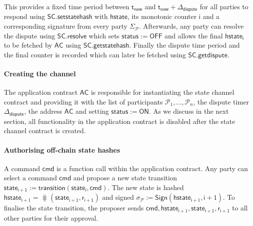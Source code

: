 \documentclass{llncs}
\newcommand{\chanstatus}{\mathsf{status}}
\newcommand{\chanon}{\mathsf{ON}}
\newcommand{\chanoff}{\mathsf{OFF}}
\newcommand{\cmd}{\mathsf{cmd}}
\newcommand{\hstate}{\mathsf{hstate}}
\newcommand{\hstatei}{\mathsf{hstate}_{\monotoniccounter}}
\newcommand{\hstateplus}{\ensuremath{\mathsf{hstate}_{\monotoniccounter+1}}}
\newcommand{\monotoniccounter}{\mathsf{i}}
\newcommand{\stateinfoi}{\mathsf{state}_{\mathsf{i}}}
\newcommand{\stateinfoplus}{\mathsf{state}_{\mathsf{i+1}}}
\newcommand{\participant}{\mathcal{P}}
\newcommand{\ranplus}{\mathsf{r}_{\mathsf{i+1}}}
\newcommand{\statechannelsetstate}{\mathsf{SC}.\mathsf{setstatehash}}
\newcommand{\statechannelresolve}{\mathsf{SC}.\mathsf{resolve}}
\newcommand{\statechannelgetcommitment}{\mathsf{SC}.\mathsf{getstatehash}}
\newcommand{\statechannelgetdispute}{\mathsf{SC}.\mathsf{getdispute}}
\newcommand{\sign}{\mathsf{Sign}}
\newcommand{\appcontract}{\mathsf{AC}}
\newcommand{\timerdispute}{\mathsf{\Delta}_{\mathsf{dispute}}}
\newcommand{\timenow}{\mathsf{t}_{\mathsf{now}}}
\newcommand{\timedispute}{\timenow + \mathsf{\Delta}_{\mathsf{dispute}}}
\begin{document}
This provides a fixed time period between $\timenow$ and $\timedispute$ for all parties to respond using $\statechannelsetstate$ with $\hstate$, its monotonic counter $\monotoniccounter$ and a corresponding signature from every party $\Sigma_{\participant}$. 
Afterwards, any party can resolve the dispute using $\statechannelresolve$ which sets $\chanstatus := \chanoff$ and allows the final $\hstatei$ to be fetched by $\appcontract$ using  $\statechannelgetcommitment$. 
Finally the dispute time period and the final counter is recorded which can later be fetched using $\statechannelgetdispute$. 
%
%

\paragraph{Creating the channel} 

The application contract $\appcontract$ is responsible for instantiating the state channel contract and providing it with the list of participants $\participant_{1},...,\participant_{n}$, the dispute timer $\timerdispute$, the address $\appcontract$ and setting $\chanstatus := \chanon$. 
As we discuss in the next section, all functionality in the application contract is disabled after the state channel contract is created. 

\paragraph{Authorising off-chain state hashes}
A command $\cmd$ is a function call within the application contract.
Any party can select a command $\cmd$ and propose a new state transition $\stateinfoplus := \mathsf{transition}(\stateinfoi, \cmd)$.
The new state is hashed  $\hstateplus = \hash(\stateinfoplus, \ranplus)$ and signed  $\sigma_{\participant} := \sign(\hstateplus,\monotoniccounter+1)$.
To finalise the state transition, the proposer sends $\cmd,\hstateplus, \stateinfoplus, \ranplus$ to all other parties for their approval.
\end{document}
